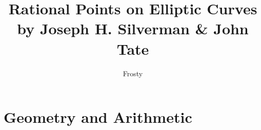 \documentclass[10pt]{article}  %
\title{Rational Points on Elliptic Curves \\ by Joseph H. Silverman \& John Tate}
\author{Frosty}
\begin{document}
\maketitle

\tableofcontents

\section{Geometry and Arithmetic}

\end{document}
